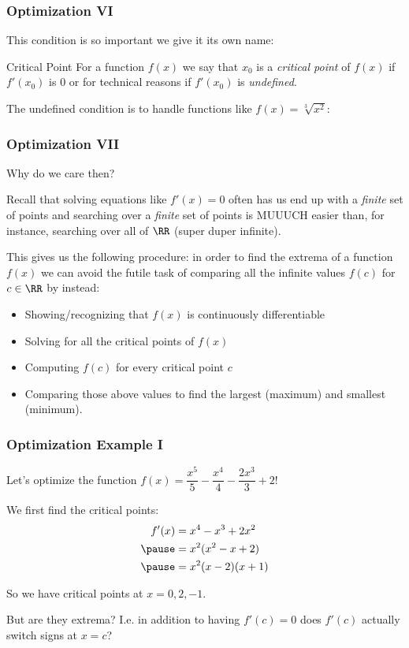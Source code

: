 \documentclass{ltx-talk}
\begin{document}
\begin{frame}
  \frametitle{Optimization VI}
  This condition is so important we give it its own name:

  \begin{block}{Critical Point}
    For a function $f(x)$ we say that $x_0$
    is a \textit{critical point} of $f(x)$ if $f'(x_0)$ is $0$ \pause or for
    technical reasons if $f'(x_0)$ is \textit{undefined}.
  \end{block} \pause

  The undefined condition is to handle functions like $f(x) = \sqrt[3]{x^2}$:
  \vfill
\end{frame}

\begin{frame}
  \frametitle{Optimization VII}
  Why do we care then?\pause

  Recall that solving equations like $f'(x) = 0$ often has us end up with
  a \textit{finite} set of points \pause and searching over a \textit{finite} set of points is MUUUCH easier than, for instance, searching over all of $\RR$ (super duper infinite).

  This gives us the following procedure: \pause in order to find the extrema of a function $f(x)$ we can avoid the futile task of comparing all the infinite values $f(c)$ for $c \in \RR$ by instead:
  \begin{itemize}
    \item Showing/recognizing that $f(x)$ is continuously differentiable \pause
    \item Solving for all the critical points of $f(x)$ \pause
    \item Computing $f(c)$ for every critical point $c$ \pause
    \item Comparing those above values to find the largest (maximum) and smallest (minimum). 
  \end{itemize}
\end{frame}

\begin{frame}
  \frametitle{Optimization Example I}
  Let's optimize the function $f(x) = \dfrac{x^5}{5} - \dfrac{x^4}{4} - \dfrac{2x^3}{3} + 2$! \pause

  We first find the critical points: \pause
  \begin{align}
    f'(x) &= x^4 - x^3 + 2x^2 \\ \pause
          &= x^2(x^2 - x + 2) \\ \pause
          &= x^2(x - 2)(x + 1)
  \end{align} \pause

  So we have critical points at $x = 0, 2, -1$. \pause

  But are they extrema? \pause I.e. in addition to having $f'(c) = 0$ does \pause $f'(c)$ actually switch signs at $x = c$?
\end{frame}
\end{document}
